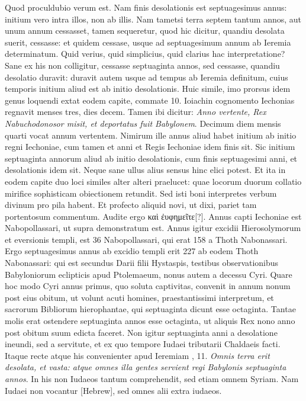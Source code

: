 Quod
proculdubio verum est.
Nam finis desolationis est septuagesimus
annus: initium vero intra illos, non ab illis.
Nam tametsi terra septem
tantum annos, aut unum annum cessasset, tamen sequeretur,
quod hic dicitur, quandiu desolata suerit, cessasse: et quidem cessase,
usque ad septuagesimum annum ab Ieremia determinatum.
Quid verius, quid simplicius, quid clarius hac interpretatione?
Sane
ex his non colligitur, cessasse septuaginta annos, sed cessasse,
quandiu desolatio duravit: duravit autem usque ad tempus ab Ieremia
definitum, cuius temporis initium aliud est ab initio desolationis.
Huic simile, imo prorsus idem genus loquendi extat eodem capite,
commate 10.
Ioiachin cognomento Iechonias regnavit menses tres,
dies decem.
Tamen ibi dicitur: \textit{Anno vertente, Rex Nabuchodonosor
misit, et deportatus fuit Babylonem}.
Decimum diem mensis quarti
vocat annum vertentem.
Nimirum ille annus aliud habet initium
ab initio regni Iechoniae, cum tamen et anni et Regis Iechoniae
idem finis sit.
Sic initium septuaginta annorum aliud ab initio desolationis,
cum finis septuagesimi anni, et desolationis idem sit.
Neque sane ullus alius sensus hinc elici potest.
Et ita in eodem capite
duo loci similes alter alteri praelucet: quae locorum duorum
collatio mirifice sophisticam obiectionem retundit.
Sed isti boni
interpretes verbum divinum pro pila habent.
Et profecto aliquid
novi, ut dixi, pariet tam portentosum commentum.
Audite
ergo \textgreek{καὶ ἐυφημεῖτε[?]}.
Annus capti Iechoniae est  Nabopollassari,
ut supra demonstratum est.
Annus igitur excidii Hierosolymorum
et eversionis templi, est 36 Nabopollassari, qui erat 158 a
Thoth Nabonassari.
Ergo septuagesimus annus ab excidio templi
erit 227 ab eodem Thoth Nabonassari: qui est secundus Darii filii
Hystaspis, testibus observationibus Babyloniorum eclipticis apud
Ptolemaeum, nonus autem a decessu Cyri.
Quare hoc modo
Cyri annus primus, quo soluta captivitas, convenit in annum
nonum post eius obitum, ut volunt acuti homines, praestantissimi
interpretum, et sacrorum Bibliorum hierophantae, qui septuaginta
dicunt esse octaginta.
Tantae molis erat ostendere septuaginta
annos esse octaginta, ut aliquis Rex nono anno post obitum
suum edicta faceret.
Non igitur septuaginta anni a desolatione
ineundi, sed a servitute, et ex quo tempore Iudaei tributarii
Chaldaeis facti.
Itaque recte atque his convenienter apud Ieremiam
, 11.
\textit{Omnis terra erit desolata, et vasta: atque omnes
illa gentes servient regi Babylonis septuaginta annos}.
In his non Iudaeos
tantum comprehendit, sed etiam omnem Syriam.
Nam Iudaei
non vocantur \texthebrew{[Hebrew]}, sed omnes alii extra iudaeos.

